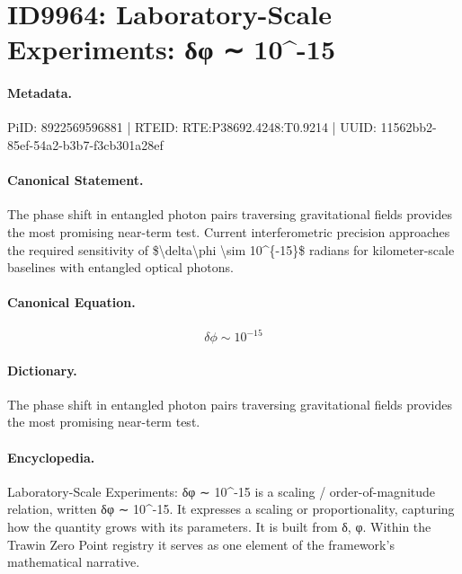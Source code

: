\section*{ID9964: Laboratory-Scale Experiments: δφ ∼ 10\textasciicircum{}-15}
\paragraph{Metadata.}
PiID: 8922569596881 | RTEID: RTE:P38692.4248:T0.9214 | UUID: 11562bb2-85ef-54a2-b3b7-f3cb301a28ef

\paragraph{Canonical Statement.}
The phase shift in entangled photon pairs traversing gravitational fields provides the most promising near-term test. Current interferometric precision approaches the required sensitivity of \$\textbackslash{}delta\textbackslash{}phi \textbackslash{}sim 10\textasciicircum{}\{-15\}\$ radians for kilometer-scale baselines with entangled optical photons.

\paragraph{Canonical Equation.}
\[
\delta\phi \sim 10^{-15}
\]

\paragraph{Dictionary.}
The phase shift in entangled photon pairs traversing gravitational fields provides the most promising near-term test.

\paragraph{Encyclopedia.}
Laboratory-Scale Experiments: δφ ∼ 10\textasciicircum{}-15 is a scaling / order-of-magnitude relation, written δφ ∼ 10\textasciicircum{}-15. It expresses a scaling or proportionality, capturing how the quantity grows with its parameters. It is built from δ, φ. Within the Trawin Zero Point registry it serves as one element of the framework's mathematical narrative.
